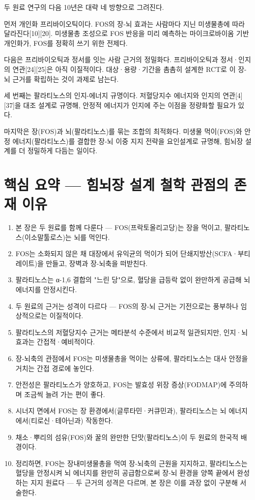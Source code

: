 \documentclass[12pt,oneside]{book}
\begin{document}
두 원료 연구의 다음 10년은 대략 네 방향으로 그려진다.

먼저 개인화 프리바이오틱이다. FOS의 장-뇌 효과는 사람마다 지닌 미생물총에 따라 달라진다[10][20]. 미생물총 조성으로 FOS 반응을 미리 예측하는 마이크로바이옴 기반 개인화가, FOS를 정확히 쓰기 위한 전제다.

다음은 프리바이오틱과 정서를 잇는 사람 근거의 정밀화다. 프리바이오틱과 정서·인지의 연관[24][25]은 아직 이질적이다. 대상·용량·기간을 촘촘히 설계한 RCT로 이 장-뇌 근거를 확립하는 것이 과제로 남는다.

세 번째는 팔라티노스의 인지-에너지 규명이다. 저혈당지수 에너지와 인지의 연관[4][37]을 대조 설계로 규명해, 안정적 에너지가 인지에 주는 이점을 정량화할 필요가 있다.

마지막은 장(FOS)과 뇌(팔라티노스)를 묶는 조합의 최적화다. 미생물 먹이(FOS)와 안정 에너지(팔라티노스)를 결합한 장-뇌 이중 지지 전략을 요인설계로 규명해, 힘뇌장 설계를 더 정밀하게 다듬는 일이다.

\section{핵심 요약 — 힘뇌장 설계 철학 관점의 존재 이유}

\begin{enumerate}[leftmargin=6mm,itemsep=1pt,topsep=2pt]
  \item 본 장은 두 원료를 함께 다룬다 — FOS(프락토올리고당)는 장을 먹이고, 팔라티노스(이소말툴로스)는 뇌를 먹인다.
  \item FOS는 소화되지 않은 채 대장에서 유익균의 먹이가 되어 단쇄지방산(SCFA·부티레이트)을 만들고, 장벽과 장-뇌축을 떠받친다.
  \item 팔라티노스는 α-1,6 결합의 "느린 당"으로, 혈당을 급등락 없이 완만하게 공급해 뇌 에너지를 안정시킨다.
  \item 두 원료의 근거는 성격이 다르다 — FOS의 장-뇌 근거는 기전으로는 풍부하나 임상적으로는 이질적이다.
  \item 팔라티노스의 저혈당지수 근거는 메타분석 수준에서 비교적 일관되지만, 인지·뇌 효과는 간접적·예비적이다.
  \item 장-뇌축의 관점에서 FOS는 미생물총을 먹이는 상류에, 팔라티노스는 대사 안정을 거치는 간접 경로에 놓인다.
  \item 안전성은 팔라티노스가 양호하고, FOS는 발효성 위장 증상(FODMAP)에 주의하며 조금씩 늘려 가는 편이 좋다.
  \item 시너지 면에서 FOS는 장 환경에서(글루타민·커큐민과), 팔라티노스는 뇌 에너지에서(티로신·테아닌과) 작동한다.
  \item 채소·뿌리의 섬유(FOS)와 꿀의 완만한 단맛(팔라티노스)이 두 원료의 한국적 배경이다.
  \item 정리하면, FOS는 장내미생물총을 먹여 장-뇌축의 근원을 지지하고, 팔라티노스는 혈당을 안정시켜 뇌 에너지를 완만히 공급함으로써 장-뇌 환경을 양쪽 끝에서 완성하는 지지 원료다 — 두 근거의 성격은 다르며, 본 장은 이를 과장 없이 구분해 서술한다.
\end{enumerate}
\end{document}
